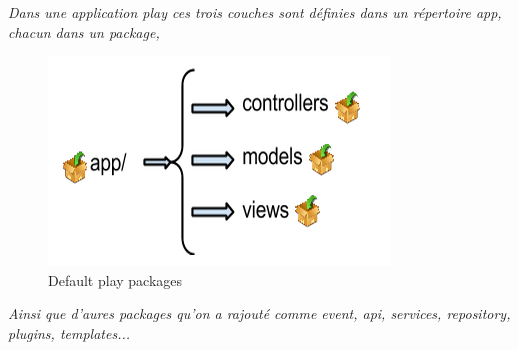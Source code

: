 \textit{Dans une application play ces trois couches sont définies dans un répertoire app, chacun dans un package,}
\begin{figure}[H]
        \centering
                \centering
                \includegraphics[width=\textwidth]{packages_play.png}
                \caption{Default play packages}
                \label{fig:Default play packages}
       
\end{figure}
\textit{Ainsi que d'aures packages qu'on a rajouté comme event, api, services, repository, plugins, templates...}

